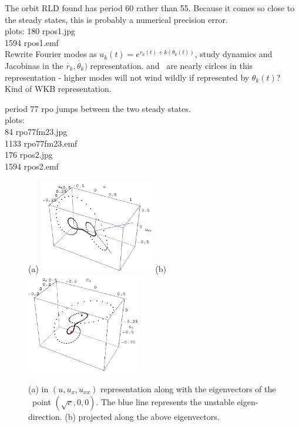The orbit RLD found has period 60
rather than 55.  Because it comes so close to the steady states,
this is probably a numerical precision error.
\\
plots:
 180 rpos1.jpg  \\
1594 rpos1.emf  \\


Rewrite Fourier modes as $u_k(t) = e^{r_k(t) + k(\theta_k(t))}$, study
dynamics and Jacobinas in the $\dot{r_k},\dot{\theta_k})$ representation.
 and  \eqva\ are nearly cirlces in this representation - higher
modes will not wind wildly if represented by $\theta_k(t)$? Kind of WKB
representation.

period 77 rpo jumps between the two steady states.
\\
plots:  \\
  84 rpo77fm23.jpg  \\
1133 rpo77fm23.emf  \\
 176 rpos2.jpg  \\
1594 rpos2.emf  \\


\bigskip

\begin{figure}[t]
\begin{center}
(a) \includegraphics[width=5.0cm]{../figs/1wSteadyE}
\hspace{0.1in}
(b) \includegraphics[width=5.0cm]{../figs/1wSteadyP}
\end{center}
\caption[EQV{1} visualization]
        {
(a)  in $(u,u_x,u_{xx})$ representation along with the eigenvectors of the \eqv\
point $(\sqrt{c},0,0)$. The blue line represents the unstable eigen-direction.
(b) \EQV{1} projected along the above eigenvectors.
        }
\label{f:1wSteady}
\end{figure}


